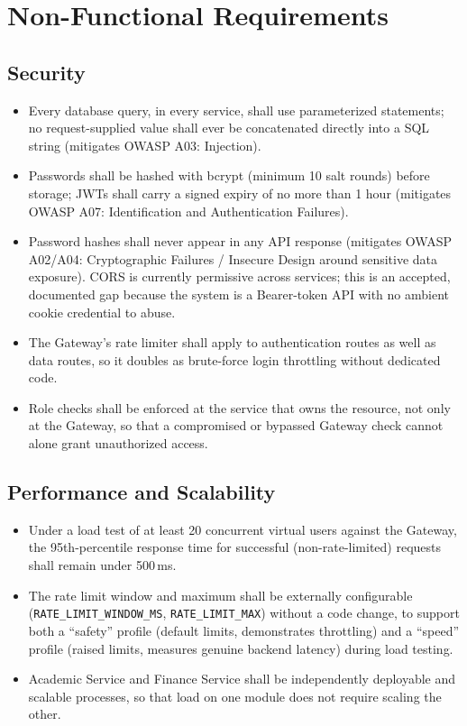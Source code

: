 \documentclass[11pt,a4paper]{report}
\begin{document}
\chapter{Non-Functional Requirements}

\section{Security}
\begin{itemize}[itemsep=3pt]
    \item[NFR-SEC-1] Every database query, in every service, shall use parameterized statements; no request-supplied value shall ever be concatenated directly into a SQL string (mitigates OWASP A03: Injection).
    \item[NFR-SEC-2] Passwords shall be hashed with bcrypt (minimum 10 salt rounds) before storage; JWTs shall carry a signed expiry of no more than 1 hour (mitigates OWASP A07: Identification and Authentication Failures).
    \item[NFR-SEC-3] Password hashes shall never appear in any API response (mitigates OWASP A02/A04: Cryptographic Failures / Insecure Design around sensitive data exposure). CORS is currently permissive across services; this is an accepted, documented gap because the system is a Bearer-token API with no ambient cookie credential to abuse.
    \item[NFR-SEC-4] The Gateway's rate limiter shall apply to authentication routes as well as data routes, so it doubles as brute-force login throttling without dedicated code.
    \item[NFR-SEC-5] Role checks shall be enforced at the service that owns the resource, not only at the Gateway, so that a compromised or bypassed Gateway check cannot alone grant unauthorized access.
\end{itemize}

\section{Performance and Scalability}
\begin{itemize}[itemsep=3pt]
    \item[NFR-PERF-1] Under a load test of at least 20 concurrent virtual users against the Gateway, the 95th-percentile response time for successful (non-rate-limited) requests shall remain under 500\,ms.
    \item[NFR-PERF-2] The rate limit window and maximum shall be externally configurable (\texttt{RATE\_LIMIT\_WINDOW\_MS}, \texttt{RATE\_LIMIT\_MAX}) without a code change, to support both a ``safety'' profile (default limits, demonstrates throttling) and a ``speed'' profile (raised limits, measures genuine backend latency) during load testing.
    \item[NFR-PERF-3] Academic Service and Finance Service shall be independently deployable and scalable processes, so that load on one module does not require scaling the other.
\end{itemize}
\end{document}
